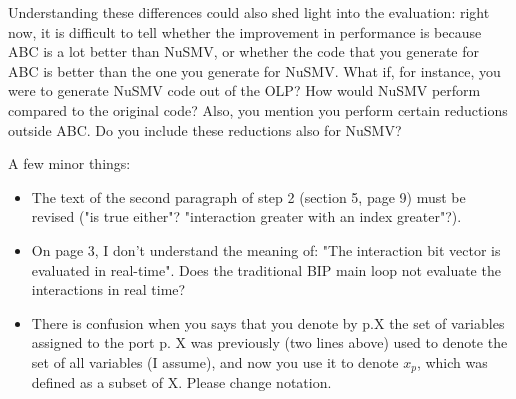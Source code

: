 Understanding these differences could also shed light into the evaluation:
right now, it is difficult to tell whether the improvement in performance is
because ABC is a lot better than NuSMV, or whether the code that you generate
for ABC is better than the one you generate for NuSMV. What if, for instance,
you were to generate NuSMV code out of the OLP? How would NuSMV perform
compared to the original code? Also, you mention you perform certain
reductions outside ABC. Do you include these reductions also for NuSMV?


A few minor things:

\begin{itemize}
\item The text of the second paragraph of step 2 (section 5, page 9) must be
revised ("is true either"? "interaction greater with an index greater"?).

\item On page 3, I don't understand the meaning of: "The interaction bit vector is
evaluated in real-time". Does the traditional BIP main loop not evaluate the
interactions in real time?

\item There is confusion when you says that you denote by p.X the set of variables
assigned to the port p. X was previously (two lines above) used to denote
the set of all variables (I assume), and now you use it to denote $x_p$, which
was defined as a subset of X. Please change notation.
\end{itemize}



